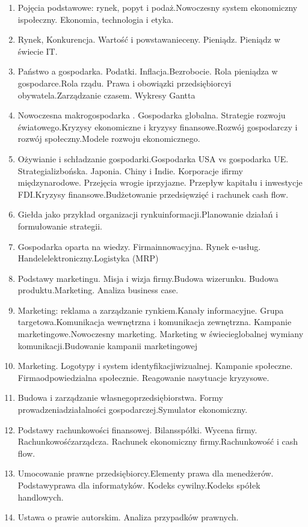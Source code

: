 \documentclass[12pt, a4paper]{article}
\begin{document}
\begin{enumerate}
  \item Pojęcia podstawowe: rynek, popyt i podaż.Nowoczesny system ekonomiczny ispołeczny. Ekonomia, technologia i etyka.
  \item Rynek, Konkurencja. Wartość i powstawanieceny. Pieniądz. Pieniądz w świecie IT.
  \item Państwo a gospodarka. Podatki. Inflacja.Bezrobocie. Rola pieniądza w gospodarce.Rola rządu. Prawa i obowiązki przedsiębiorcyi obywatela.Zarządzanie czasem. Wykresy Gantta
  \item Nowoczesna makrogospodarka . Gospodarka globalna. Strategie rozwoju światowego.Kryzysy ekonomiczne i kryzysy finansowe.Rozwój gospodarczy i rozwój społeczny.Modele rozwoju ekonomicznego.
  \item Ożywianie i schładzanie gospodarki.Gospodarka USA vs gospodarka UE. Strategializbońska. Japonia. Chiny i Indie. Korporacje ifirmy międzynarodowe. Przejęcia wrogie iprzyjazne. Przepływ kapitału i inwestycje FDI.Kryzysy finansowe.Budżetowanie przedsięwzięć i rachunek cash flow.
  \item Giełda jako przykład organizacji rynkuinformacji.Planowanie działań i formułowanie strategii.
  \item Gospodarka oparta na wiedzy. Firmainnowacyjna. Rynek e-usług. Handelelektroniczny.Logistyka (MRP)
  \item Podstawy marketingu. Misja i wizja firmy.Budowa wizerunku. Budowa produktu.Marketing. Analiza business case.
  \item Marketing: reklama a zarządzanie rynkiem.Kanały informacyjne. Grupa targetowa.Komunikacja wewnętrzna i komunikacja zewnętrzna. Kampanie marketingowe.Nowoczesny marketing. Marketing w świecieglobalnej wymiany komunikacji.Budowanie kampanii marketingowej
  \item Marketing. Logotypy i system identyfikacjiwizualnej. Kampanie społeczne. Firmaodpowiedzialna społecznie. Reagowanie nasytuacje kryzysowe.
  \item Budowa i zarządzanie własnegoprzedsiębiorstwa. Formy prowadzeniadziałalności gospodarczej.Symulator ekonomiczny.
  \item Podstawy rachunkowości finansowej. Bilansspółki. Wycena firmy. Rachunkowośćzarządcza. Rachunek ekonomiczny firmy.Rachunkowość i cash flow.
  \item Umocowanie prawne przedsiębiorcy.Elementy prawa dla menedżerów. Podstawyprawa dla informatyków. Kodeks cywilny.Kodeks spółek handlowych.
  \item Ustawa o prawie autorskim. Analiza przypadków prawnych.
\end{enumerate}
\end{document}
